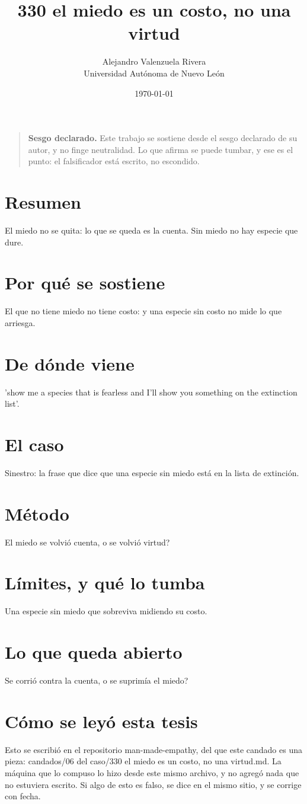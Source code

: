 \documentclass[11pt,a4paper]{article}
\title{330 el miedo es un costo, no una virtud}
\author{Alejandro Valenzuela Rivera\\\small Universidad Autónoma de Nuevo León}
\date{\today}
\begin{document}
\maketitle

\begin{quote}
\textbf{Sesgo declarado.} Este trabajo se sostiene desde el sesgo declarado de su autor, y no finge neutralidad. Lo que afirma se puede tumbar, y ese es el punto: el falsificador está escrito, no escondido.
\end{quote}

\section*{Resumen}
El miedo no se quita: lo que se queda es la cuenta. Sin miedo no hay especie que dure.

\section{Por qué se sostiene}
El que no tiene miedo no tiene costo: y una especie sin costo no mide lo que arriesga.

\section{De dónde viene}
'show me a species that is fearless and I'll show you something on the extinction list'.

\section{El caso}
Sinestro: la frase que dice que una especie sin miedo está en la lista de extinción.

\section{Método}
\textquestiondown{}El miedo se volvió cuenta, o se volvió virtud?

\section{Límites, y qué lo tumba}
Una especie sin miedo que sobreviva midiendo su costo.

\section{Lo que queda abierto}
\textquestiondown{}Se corrió contra la cuenta, o se suprimía el miedo?

\section*{Cómo se leyó esta tesis}
Esto se escribió en el repositorio man-made-empathy, del que este candado es una pieza: candados/06 del caso/330 el miedo es un costo, no una virtud.md. La máquina que lo compuso lo hizo desde este mismo archivo, y no agregó nada que no estuviera escrito. Si algo de esto es falso, se dice en el mismo sitio, y se corrige con fecha.
\end{document}
